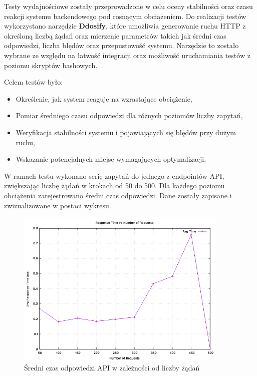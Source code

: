 Testy wydajnościowe zostały przeprowadzone w celu oceny stabilności oraz czasu reakcji systemu backendowego pod rosnącym obciążeniem. Do realizacji testów wykorzystano narzędzie \textbf{Ddosify}, które umożliwia generowanie ruchu HTTP z określoną liczbą żądań oraz mierzenie parametrów takich jak średni czas odpowiedzi, liczba błędów oraz przepustowość systemu. Narzędzie to zostało wybrane ze względu na łatwość integracji oraz możliwość uruchamiania testów z poziomu skryptów bashowych.

Celem testów było:
\begin{itemize}
    \item Określenie, jak system reaguje na wzrastające obciążenie,
    \item Pomiar średniego czasu odpowiedzi dla różnych poziomów liczby zapytań,
    \item Weryfikacja stabilności systemu i pojawiających się błędów przy dużym ruchu,
    \item Wskazanie potencjalnych miejsc wymagających optymalizacji.
\end{itemize}

W ramach testu wykonano serię zapytań do jednego z endpointów API, zwiększając liczbę żądań w krokach od 50 do 500. Dla każdego poziomu obciążenia zarejestrowano średni czas odpowiedzi. Dane zostały zapisane i zwizualizowane w postaci wykresu.

\begin{figure}[H]
    \centering
    \includegraphics[width=0.9\textwidth]{chapters/assets/wykres czasu odpowiedzi.png}
    \caption{Średni czas odpowiedzi API w zależności od liczby żądań}
\end{figure}

